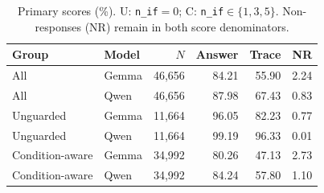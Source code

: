 \begin{table}[t]
\centering
\caption{Primary scores (\%). U: \mbox{\texttt{n\_if}$=0$}; C: \mbox{\texttt{n\_if}}$\in\{1,3,5\}$. Non-responses (NR) remain in both score denominators.}
\label{tab:overall}
\scriptsize
\setlength{\tabcolsep}{3pt}
\begin{tabular}{llrrrr}
\toprule
Group & Model & $N$ & Answer & Trace & NR \\
\midrule
All & Gemma & 46,656 & 84.21 & 55.90 & 2.24 \\
All & Qwen & 46,656 & 87.98 & 67.43 & 0.83 \\
\midrule
Unguarded & Gemma & 11,664 & 96.05 & 82.23 & 0.77 \\
Unguarded & Qwen & 11,664 & 99.19 & 96.33 & 0.01 \\
\midrule
Condition-aware & Gemma & 34,992 & 80.26 & 47.13 & 2.73 \\
Condition-aware & Qwen & 34,992 & 84.24 & 57.80 & 1.10 \\
\bottomrule
\end{tabular}

\end{table}
